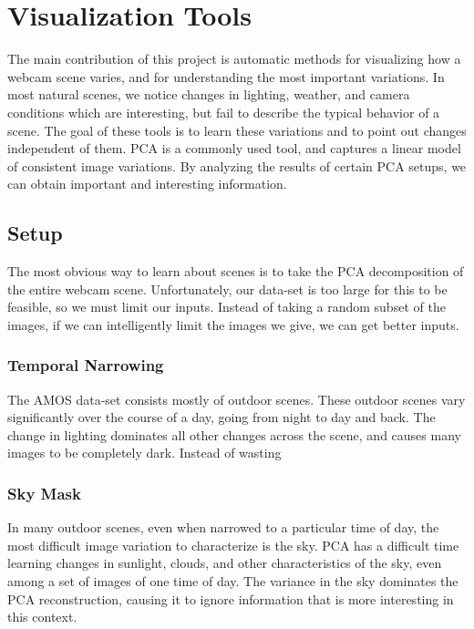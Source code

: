 \chapter{Visualization Tools}
\label{cpt:tools}

The main contribution of this project is automatic methods for visualizing how a webcam scene varies, and for understanding the most important variations.  In most natural scenes, we notice changes in lighting, weather, and camera conditions which are interesting, but fail to describe the typical behavior of a scene.  The goal of these tools is to learn these variations and to point out changes independent of them.  PCA is a commonly used tool, and
captures a linear model of consistent image variations.  By analyzing the results of certain PCA setups, we can obtain important and interesting information.

\section{Setup}

The most obvious way to learn about scenes is to take the PCA decomposition of the entire webcam scene.  Unfortunately, our data-set is too large for this to be feasible, so we must limit our inputs.  Instead of taking a random subset of the images, if we can intelligently limit the images we give, we can get better inputs.

\subsection{Temporal Narrowing}

The AMOS data-set consists mostly of outdoor scenes.  These outdoor scenes vary significantly over the course of a day, going from night to day and back.  The change in lighting dominates all other changes across the scene, and causes many images to be completely dark.  Instead of wasting 

\subsection{Sky Mask}
In many outdoor scenes, even when narrowed to a particular time of day, the most difficult image
variation to characterize is the sky.  PCA has a difficult time learning changes in sunlight, clouds,
and other characteristics of the sky, even among a set of images of one time of day.  The variance in the sky dominates the PCA reconstruction, causing it to ignore information that is more interesting in this context.

